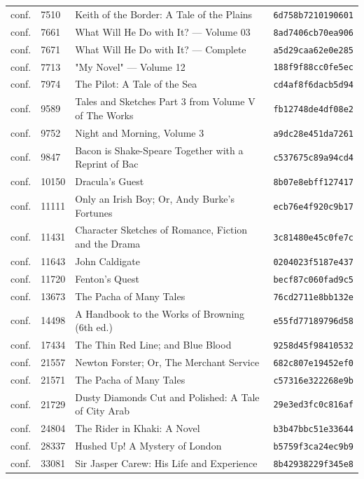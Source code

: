 \documentclass[11pt]{article}
\begin{document}
{\begin{longtable}{p{0.9cm}p{1.0cm}p{8.4cm}p{3.2cm}}
conf. & 7510 & Keith of the Border: A Tale of the Plains & \texttt{6d758b7210190601} \\
conf. & 7661 & What Will He Do with It? — Volume 03 & \texttt{8ad7406cb70ea906} \\
conf. & 7671 & What Will He Do with It? — Complete & \texttt{a5d29caa62e0e285} \\
conf. & 7713 & "My Novel" — Volume 12 & \texttt{188f9f88cc0fe5ec} \\
conf. & 7974 & The Pilot: A Tale of the Sea & \texttt{cd4af8f6dacb5d94} \\
conf. & 9589 & Tales and Sketches Part 3 from Volume V of The Works & \texttt{fb12748de4df08e2} \\
conf. & 9752 & Night and Morning, Volume 3 & \texttt{a9dc28e451da7261} \\
conf. & 9847 & Bacon is Shake-Speare Together with a Reprint of Bac & \texttt{c537675c89a94cd4} \\
conf. & 10150 & Dracula's Guest & \texttt{8b07e8ebff127417} \\
conf. & 11111 & Only an Irish Boy; Or, Andy Burke's Fortunes & \texttt{ecb76e4f920c9b17} \\
conf. & 11431 & Character Sketches of Romance, Fiction and the Drama & \texttt{3c81480e45c0fe7c} \\
conf. & 11643 & John Caldigate & \texttt{0204023f5187e437} \\
conf. & 11720 & Fenton's Quest & \texttt{becf87c060fad9c5} \\
conf. & 13673 & The Pacha of Many Tales & \texttt{76cd2711e8bb132e} \\
conf. & 14498 & A Handbook to the Works of Browning (6th ed.) & \texttt{e55fd77189796d58} \\
conf. & 17434 & The Thin Red Line; and Blue Blood & \texttt{9258d45f98410532} \\
conf. & 21557 & Newton Forster; Or, The Merchant Service & \texttt{682c807e19452ef0} \\
conf. & 21571 & The Pacha of Many Tales & \texttt{c57316e322268e9b} \\
conf. & 21729 & Dusty Diamonds Cut and Polished: A Tale of City Arab & \texttt{29e3ed3fc0c816af} \\
conf. & 24804 & The Rider in Khaki: A Novel & \texttt{b3b47bbc51e33644} \\
conf. & 28337 & Hushed Up! A Mystery of London & \texttt{b5759f3ca24ec9b9} \\
conf. & 33081 & Sir Jasper Carew: His Life and Experience & \texttt{8b42938229f345e8} \\

\end{longtable}}
\end{document}
